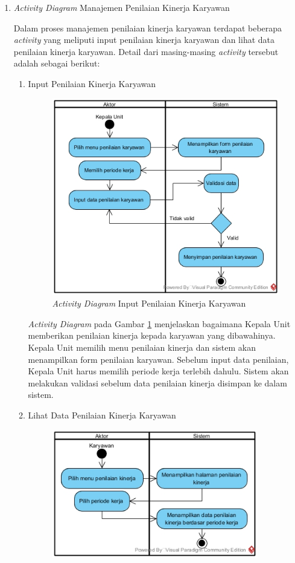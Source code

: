 \begin{enumerate}
            	\item \emph{Activity Diagram} Manajemen Penilaian Kinerja Karyawan
            	
            	Dalam proses manajemen penilaian kinerja karyawan terdapat beberapa \emph{activity} yang meliputi input penilaian kinerja karyawan dan lihat data penilaian kinerja karyawan. Detail dari masing-masing \emph{activity} tersebut adalah sebagai berikut:
            	\begin{enumerate}[label=\alph*.]
            	    \itemsep0em
            	    \item Input Penilaian Kinerja Karyawan
            	    \begin{figure}[H]
            		    \centering
            		    \includegraphics[width=11cm]{gambar/activity/input-penilaian-pegawai}
            		    \caption{\emph{Activity Diagram} Input Penilaian Kinerja Karyawan}
            		    \label{activity_input_penilaian}
            		\end{figure}
            		\emph{Activity Diagram} pada Gambar \ref{activity_input_penilaian} menjelaskan bagaimana Kepala Unit memberikan penilaian kinerja kepada karyawan yang dibawahinya. Kepala Unit memilih menu penilaian kinerja dan sistem akan menampilkan form penilaian karyawan. Sebelum input data penilaian, Kepala Unit harus memilih periode kerja terlebih dahulu. Sistem akan melakukan validasi sebelum data penilaian kinerja disimpan ke dalam sistem.
            	    \item Lihat Data Penilaian Kinerja Karyawan
            	    \begin{figure}[H]
            		    \centering
            		    \includegraphics[width=9cm]{gambar/activity/lihat-data-penilaian-kinerja}

\end{figure}
\end{enumerate}
\end{enumerate}
